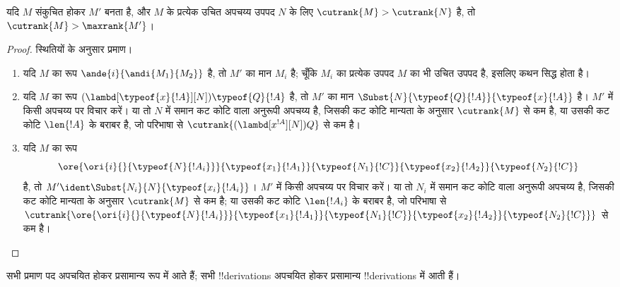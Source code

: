 \documentclass[../../../include/open-logic-section]{subfiles}
\begin{document}
\begin{lem}
  यदि $M$ संकुचित होकर $M'$ बनता है, और $M$ के प्रत्येक उचित अपचय्य उपपद
  $N$ के लिए $\cutrank{M} > \cutrank{N}$ है, तो $\cutrank{M} >
  \maxrank{M'}$।
\end{lem}

\begin{proof}
  स्थितियों के अनुसार प्रमाण।
  \begin{enumerate}
  \item यदि $M$ का रूप $\ande{i}{\andi{M_1}{M_2}}$ है, तो $M'$ का मान
    $M_i$ है; चूँकि $M_i$ का प्रत्येक उपपद $M$ का भी उचित उपपद है,
    इसलिए कथन सिद्ध होता है।
  \item यदि $M$ का रूप
    $(\lambd[\typeof{x}{!A}][N])\typeof{Q}{!A}$ है, तो $M'$ का मान
    $\Subst{N}{\typeof{Q}{!A}}{\typeof{x}{!A}}$ है। $M'$ में किसी अपचय्य
    पर विचार करें। या तो $N$ में समान कट कोटि वाला अनुरूपी अपचय्य है,
    जिसकी कट कोटि मान्यता के अनुसार $\cutrank{M}$ से कम है, या उसकी कट कोटि
    $\len{!A}$ के बराबर है, जो परिभाषा से
    $\cutrank{(\lambd[x^{!A}][N])Q}$ से कम है।
  \item यदि $M$ का रूप
    \[
    \ore{\ori{i}{}{\typeof{N}{!A_i}}}
        {\typeof{x_1}{!A_1}}{\typeof{N_1}{!C}}
        {\typeof{x_2}{!A_2}}{\typeof{N_2}{!C}}
    \]
    है, तो $M' \ident \Subst{N_i}{N}{\typeof{x_i}{!A_i}}$। $M'$ में किसी
    अपचय्य पर विचार करें। या तो $N_i$ में समान कट कोटि वाला अनुरूपी अपचय्य
    है, जिसकी कट कोटि मान्यता के अनुसार $\cutrank{M}$ से कम है; या उसकी कट
    कोटि $\len{!A_i}$ के बराबर है, जो परिभाषा से
    $\cutrank{\ore{\ori{i}{}{\typeof{N}{!A_i}}}
      {\typeof{x_1}{!A_1}}{\typeof{N_1}{!C}}
      {\typeof{x_2}{!A_2}}{\typeof{N_2}{!C}}}$ से कम है।
  \end{enumerate}
\end{proof}

\begin{thm}
  सभी प्रमाण पद अपचयित होकर प्रसामान्य रूप में आते हैं; सभी !!{derivation}s
  अपचयित होकर प्रसामान्य !!{derivation}s में आती हैं।
\end{thm}
\end{document}
